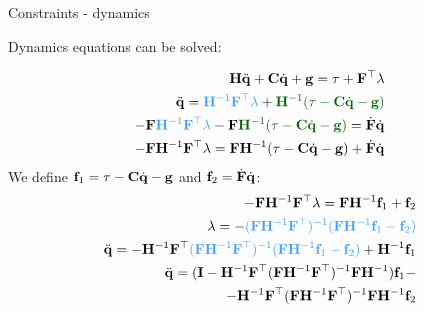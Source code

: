 \documentclass{beamer}
\begin{document}
\begin{frame}{Constraints - dynamics}
	\begin{flushleft}
		
		Dynamics equations can be solved:
		
		\begin{align}
			\bo{H} \ddot{\bo{q}} + \bo{C} \dot{\bo{q}} + \bo{g} = \tau + \bo{F}\T \lambda
			\\
			\ddot{\bo{q}} =  \textcolor{mydarkblue}{\bo{H}^{-1}\bo{F}\T \lambda} + \textcolor{mydarkgreen}{\bo{H}^{-1} ( \tau - \bo{C} \dot{\bo{q}} - \bo{g} )}
			\\
			-\bo{F}\textcolor{mydarkblue}{\bo{H}^{-1}\bo{F}\T \lambda} -\bo{F} \textcolor{mydarkgreen}{\bo{H}^{-1} ( \tau - \bo{C} \dot{\bo{q}} - \bo{g} )} = \dot{\bo{F}} \dot{\bo{q}} 
			\\
			-\bo{F}\bo{H}^{-1}\bo{F}\T \lambda = \bo{F} \bo{H}^{-1} ( \tau - \bo{C} \dot{\bo{q}} - \bo{g}) + \dot{\bo{F}} \dot{\bo{q}}
		\end{align}		
		We define $\mathbf{f}_1 = \tau - \mathbf{C} \dot{\mathbf{q}} - \mathbf{g}$ and $\mathbf{f}_2 = \dot{\mathbf{F}} \dot{\mathbf{q}}$:
		\begin{align}
			-\bo{F}\bo{H}^{-1}\bo{F}\T \lambda = \bo{F} \bo{H}^{-1} \bo{f}_1 + \bo{f}_2
			\\
			\lambda = -\textcolor{mydarkblue}{(\bo{F}\bo{H}^{-1}\bo{F}\T )^{-1}(\bo{F} \bo{H}^{-1} \bo{f}_1 - \bo{f}_2)}
			\\
			\ddot{\bo{q}} =  -\bo{H}^{-1}\bo{F}\T  \textcolor{mydarkblue}{(\bo{F}\bo{H}^{-1}\bo{F}\T )^{-1}(\bo{F} \bo{H}^{-1} \bo{f}_1 - \bo{f}_2)} + \bo{H}^{-1} \bo{f}_1
			\\
			\ddot{\bo{q}} =  (\bo{I} - \bo{H}^{-1}\bo{F}\T (\bo{F}\bo{H}^{-1}\bo{F}\T )^{-1} \bo{F} \bo{H}^{-1}) \bo{f}_1 - \\
			-
			\bo{H}^{-1}\bo{F}\T (\bo{F}\bo{H}^{-1}\bo{F}\T )^{-1}\bo{F} \bo{H}^{-1} \bo{f}_2
		\end{align}				
		
		
	\end{flushleft}
\end{frame}
\end{document}

